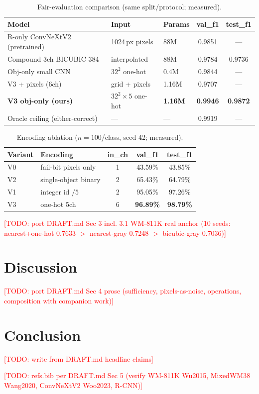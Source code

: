 \documentclass[11pt]{article}
\newcommand{\todo}[1]{\textcolor{red}{[TODO: #1]}}
\begin{document}
\begin{table}[t]
\centering
\caption{Fair-evaluation comparison (same split/protocol; measured).}
\label{tab:main}
\begin{tabular}{lllcc}
\toprule
Model & Input & Params & val\_f1 & test\_f1 \\
\midrule
R-only ConvNeXtV2 (pretrained) & 1024\,px pixels & 88M & 0.9851 & --- \\
Compound 3ch BICUBIC 384       & interpolated    & 88M & 0.9784 & 0.9736 \\
Obj-only small CNN             & $32^2$ one-hot  & 0.4M & 0.9844 & --- \\
V3 + pixels (6ch)              & grid + pixels   & 1.16M & 0.9707 & --- \\
\textbf{V3 obj-only (ours)}    & $32^2{\times}5$ one-hot & \textbf{1.16M} & \textbf{0.9946} & \textbf{0.9872} \\
Oracle ceiling (either-correct)& ---             & ---  & 0.9919 & --- \\
\bottomrule
\end{tabular}
\end{table}

\begin{table}[t]
\centering
\caption{Encoding ablation ($n{=}100$/class, seed 42; measured).}
\label{tab:encoding}
\begin{tabular}{llccc}
\toprule
Variant & Encoding & in\_ch & val\_f1 & test\_f1 \\
\midrule
V0 & fail-bit pixels only  & 1 & 43.59\% & 43.85\% \\
V2 & single-object binary  & 2 & 65.43\% & 64.79\% \\
V1 & integer id $/5$       & 2 & 95.05\% & 97.26\% \\
V3 & one-hot 5ch           & 6 & \textbf{96.89\%} & \textbf{98.79\%} \\
\bottomrule
\end{tabular}
\end{table}

\todo{port DRAFT.md Sec 3 incl. 3.1 WM-811K real anchor (10 seeds:
nearest+one-hot 0.7633 $>$ nearest-gray 0.7248 $>$ bicubic-gray 0.7036)}

\section{Discussion}\label{sec:discussion}
\todo{port DRAFT.md Sec 4 prose (sufficiency, pixels-as-noise, operations,
composition with companion work)}

\section{Conclusion}\label{sec:conclusion}
\todo{write from DRAFT.md headline claims}


% 
\todo{refs.bib per DRAFT.md Sec 5 (verify WM-811K Wu2015, MixedWM38
Wang2020, ConvNeXtV2 Woo2023, R-CNN)}
\end{document}
